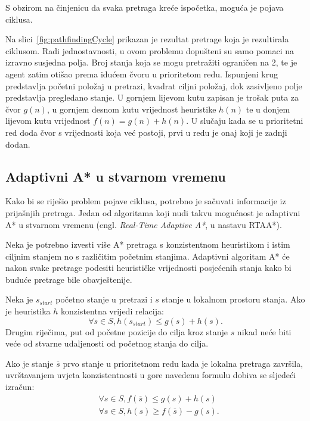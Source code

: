 \documentclass[times, utf8, zavrsni, numeric]{fer}
\begin{document}
\par S obzirom na činjenicu da svaka pretraga kreće ispočetka, moguća je pojava ciklusa. 

\par Na slici~\ref{fig:pathfindingCycle} prikazan je rezultat pretrage koja je rezultirala ciklusom. 
Radi jednostavnosti, u ovom problemu dopušteni su samo pomaci na izravno susjedna polja.
Broj stanja koja se mogu pretražiti ograničen na 2, te je agent zatim otišao prema idućem čvoru u prioritetom redu. 
Ispunjeni krug predstavlja početni položaj u pretrazi, kvadrat ciljni položaj, dok zasivljeno polje predstavlja pregledano stanje. 
U gornjem lijevom kutu zapisan je trošak puta za čvor \(g(n)\), u gornjem desnom kutu vrijednost heuristike \(h(n)\) te u donjem lijevom kutu vrijednost \(f(n) = g(n) + h(n)\).
U slučaju kada se u prioritetni red doda čvor s vrijednosti koja već postoji, prvi u redu je onaj koji je zadnji dodan.

\subsection{Adaptivni A* u stvarnom vremenu}\label{ssec:rtaastar}
\par Kako bi se riješio problem pojave ciklusa, potrebno je sačuvati informacije iz prijašnjih pretraga.
Jedan od algoritama koji nudi takvu mogućnost je adaptivni A* u stvarnom vremenu (engl. \textit{Real-Time Adaptive A*}, u nastavu RTAA*).

\par Neka je potrebno izvesti više A* pretraga s konzistentnom heuristikom i istim ciljnim stanjem no s različitim početnim stanjima. Adaptivni algoritam A* će nakon svake pretrage podesiti heurističke vrijednosti posjećenih stanja kako bi buduće pretrage bile obavještenije\cite{article:RTAAStar}.

\par Neka je \(s_{start}\) početno stanje u pretrazi i \(s\) stanje u lokalnom prostoru stanja. Ako je heuristika \(h\) konzistentna vrijedi relacija:
\begin{equation}
\forall s \in S, h(s_{start}) \leq g(s) + h(s).
\end{equation}
Drugim riječima, put od početne pozicije do cilja kroz stanje \(s\) nikad neće biti veće od stvarne udaljenosti od početnog stanja do cilja.

\par Ako je stanje \(\overline{s}\) prvo stanje u prioritetnom redu kada je lokalna pretraga završila, uvrštavanjem uvjeta konzistentnosti u gore navedenu formulu dobiva se sljedeći izračun:
\begin{equation}
\begin{aligned}
& \forall s \in S, f(\overline{s}) \leq g(s) + h(s)\\
& \forall s \in S, h(s) \geq f(\overline{s}) - g(s).
\end{aligned}
\end{equation}
\end{document}

